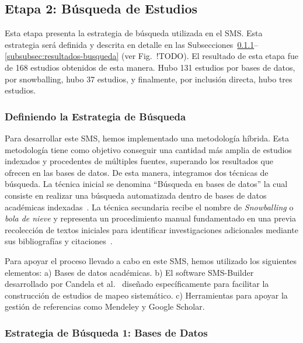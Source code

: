 \subsection{Etapa 2: Búsqueda de Estudios}

Esta etapa presenta la estrategia de búsqueda utilizada en el SMS\@. Esta estrategia será definida y descrita en detalle en las Subsecciones~\ref{subsubsec:estrategia-busqueda}--\ref{subsubsec:resultados-busqueda} (ver Fig.~!TODO). %
 El resultado de esta etapa fue de 168 estudios obtenidos de esta manera. Hubo 131 estudios por bases de datos, por snowballing, hubo 37 estudios, y finalmente, por inclusión directa, hubo tres estudios.


 
\subsubsection{Definiendo la Estrategia de Búsqueda}\label{subsubsec:estrategia-busqueda}

Para desarrollar este SMS, hemos implementado una metodología híbrida. Esta metodología tiene como objetivo conseguir una cantidad más
amplia de estudios indexados y procedentes de múltiples fuentes, superando los resultados que ofrecen en las bases de datos. De esta manera, integramos dos técnicas de búsqueda. La técnica inicial se denomina ``Búsqueda en bases de datos'' la cual consiste en realizar una búsqueda automatizada dentro de bases de datos académicas indexadas~\cite{Jalai-01}. La técnica secundaria recibe el
nombre de \textit{Snowballing} o  \textit{bola de nieve} y representa un procedimiento manual fundamentado en una  previa recolección de textos iniciales para
identificar investigaciones adicionales mediante sus bibliografías y citaciones~\cite{Jalai-01,Goodman-01}.

Para apoyar el proceso llevado a cabo en este SMS, hemos utilizado los siguientes elementos: a) Bases de datos académicas. b) El software SMS-Builder desarrollado por Candela et al.~\cite{sms-builder-repo} diseñado específicamente para facilitar la construcción de estudios de mapeo sistemático. c) Herramientas para apoyar la gestión de referencias como Mendeley y Google Scholar. %



\subsubsection{Estrategia de Búsqueda 1: Bases de Datos}

